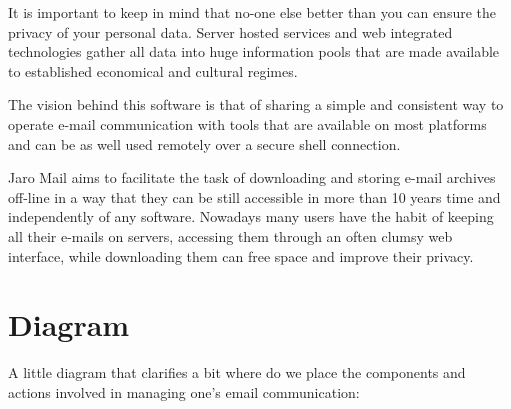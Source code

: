 \documentclass[a4,onecolumn,portrait]{article}
\begin{document}
It is important to keep in mind that no-one else better than you can
ensure the privacy of your personal data. Server hosted services and
web integrated technologies gather all data into huge information
pools that are made available to established economical and cultural
regimes.

The vision behind this software is that of sharing a simple and
consistent way to operate e-mail communication with tools that are
available on most platforms and can be as well used remotely over a
secure shell connection.

Jaro Mail aims to facilitate the task of downloading and storing e-mail
archives off-line in a way that they can be still accessible in more
than 10 years time and independently of any software. Nowadays many
users have the habit of keeping all their e-mails on servers,
accessing them through an often clumsy web interface, while
downloading them can free space and improve their privacy.

\pagebreak
\section{Diagram}
\label{sec-2}

A little diagram that clarifies a bit where do we place the components
and actions involved in managing one's email communication:
\end{document}
